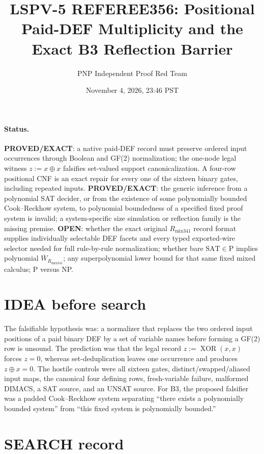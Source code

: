 \documentclass[11pt]{article}
\title{LSPV-5 REFEREE356: Positional Paid-DEF Multiplicity and the Exact B3 Reflection Barrier}
\author{PNP Independent Proof Red Team}
\date{November 4, 2026, 23:46 PST}
\begin{document}
\maketitle

\paragraph{Status.}
\textbf{PROVED/EXACT}: a native paid-DEF record must preserve ordered input occurrences through Boolean and GF(2) normalization; the one-node legal witness $z:=x\oplus x$ falsifies set-valued support canonicalization.  A four-row positional CNF is an exact repair for every one of the sixteen binary gates, including repeated inputs.  \textbf{PROVED/EXACT}: the generic inference from a polynomial SAT decider, or from the existence of some polynomially bounded Cook--Reckhow system, to polynomial boundedness of a specified fixed proof system is invalid; a system-specific size simulation or reflection family is the missing premise.  \textbf{OPEN}: whether the exact original $R_{\mathrm{mix341}}$ record format supplies individually selectable DEF facets and every typed exported-wire selector needed for full rule-by-rule normalization; whether bare $\mathrm{SAT}\in\mathrm P$ implies polynomial $\overline W_{R_{\mathrm{mix341}}}$; any superpolynomial lower bound for that same fixed mixed calculus; P versus NP.

\section{IDEA before search}

The falsifiable hypothesis was: a normalizer that replaces the two ordered input positions of a paid binary DEF by a set of variable names before forming a GF(2) row is unsound.  The prediction was that the legal record $z:=\operatorname{XOR}(x,x)$ forces $z=0$, whereas set-deduplication leaves one occurrence and produces $z\oplus x=0$.  The hostile controls were all sixteen gates, distinct/swapped/aliased input maps, the canonical four defining rows, fresh-variable failure, malformed DIMACS, a SAT source, and an UNSAT source.  For B3, the proposed falsifier was a padded Cook--Reckhow system separating ``there exists a polynomially bounded system'' from ``this fixed system is polynomially bounded.''

\section{SEARCH record}
\end{document}
